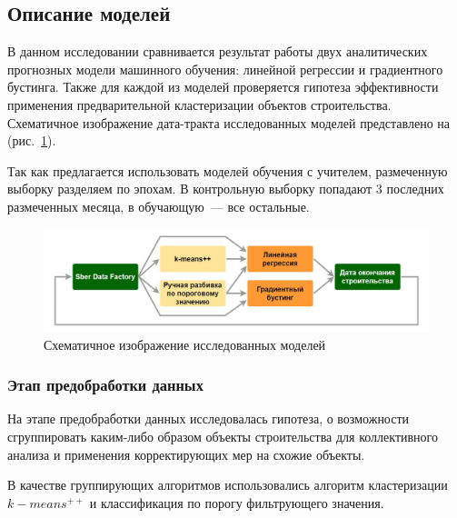 \documentclass[12pt,a4paper]{article} %
\begin{document}
\subsection{Описание моделей}

В данном исследовании сравнивается результат работы двух аналитических прогнозных модели машинного обучения: линейной регрессии и градиентного бустинга.
Также для каждой из моделей проверяется гипотеза эффективности применения предварительной кластеризации объектов строительства. Схематичное изображение дата-тракта исследованных моделей представлено на (рис.~\ref{fig:data_tract}). 

Так как предлагается использовать моделей обучения с учителем, размеченную выборку разделяем по эпохам. В контрольную выборку попадают 3 последних размеченных месяца, в обучающую~--- все остальные.  

 
\begin{figure}[h]
	
	\centering
	
	\includegraphics[width=\linewidth]{data_tract.jpg}
	
	\caption{Схематичное изображение исследованных моделей}
	
	\label{fig:data_tract}
	
\end{figure} 
 
 
 
\subsubsection{Этап предобработки данных}
 
На этапе предобработки данных исследовалась гипотеза, о возможности сгруппировать каким-либо образом объекты строительства для коллективного анализа и применения корректирующих мер на схожие объекты. 

В качестве группирующих алгоритмов использовались алгоритм кластеризации $k-means^{++}$ и классификация по порогу фильтрующего значения.
\end{document}
